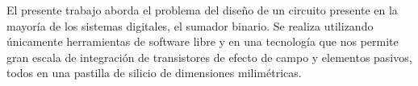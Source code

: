 \begin{abstracts}

El presente trabajo aborda el problema del diseño de un circuito presente en la mayoría de los sistemas digitales, el sumador binario. Se realiza  utilizando únicamente herramientas de software libre y en una tecnología que nos permite gran escala de integración de transistores de efecto de campo y elementos pasivos, todos en una pastilla de silicio de dimensiones milimétricas.


\end{abstracts}
